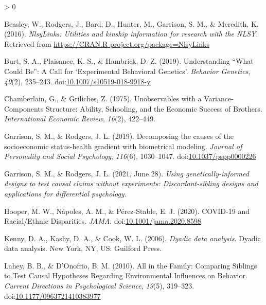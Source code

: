 \documentclass[10pt,a4paper,onecolumn]{article}
\newlength{\cslhangindent}
\newenvironment{CSLReferences}[2] %
 {%
  \setlength{\parindent}{0pt}
  \ifodd #1 \everypar{\setlength{\hangindent}{\cslhangindent}}\ignorespaces\fi
  \ifnum #2 > 0
  \setlength{\parskip}{#2\baselineskip}
  \fi
 }%
 {}
\begin{document}
\hypertarget{refs}{}
\begin{CSLReferences}{1}{0}
\leavevmode\hypertarget{ref-beasley2016}{}%
Beasley, W., Rodgers, J., Bard, D., Hunter, M., Garrison, S. M., \&
Meredith, K. (2016). \emph{NlsyLinks: Utilities and kinship information
for research with the NLSY}. Retrieved from
\url{https://CRAN.R-project.org/package=NlsyLinks}

\leavevmode\hypertarget{ref-burt2019}{}%
Burt, S. A., Plaisance, K. S., \& Hambrick, D. Z. (2019). Understanding
{``}What Could Be{''}: A Call for {`}Experimental Behavioral
Genetics{'}. \emph{Behavior Genetics}, \emph{49}(2), 235--243.
doi:\href{https://doi.org/10.1007/s10519-018-9918-y}{10.1007/s10519-018-9918-y}

\leavevmode\hypertarget{ref-chamberlain1975}{}%
Chamberlain, G., \& Griliches, Z. (1975). Unobservables with a
Variance-Components Structure: Ability, Schooling, and the Economic
Success of Brothers. \emph{International Economic Review}, \emph{16}(2),
422--449.

\leavevmode\hypertarget{ref-garrison2019}{}%
Garrison, S. M., \& Rodgers, J. L. (2019). Decomposing the causes of the
socioeconomic status-health gradient with biometrical modeling.
\emph{Journal of Personality and Social Psychology}, \emph{116}(6),
1030--1047.
doi:\href{https://doi.org/10.1037/pspp0000226}{10.1037/pspp0000226}

\leavevmode\hypertarget{ref-garrison2021}{}%
Garrison, S. M., \& Rodgers, J. L. (2021, June 28). \emph{Using
genetically-informed designs to test causal claims without experiments:
Discordant-sibling designs and applications for differential
psychology.}

\leavevmode\hypertarget{ref-hooper2020}{}%
Hooper, M. W., Nápoles, A. M., \& Pérez-Stable, E. J. (2020). COVID-19
and Racial/Ethnic Disparities. \emph{JAMA}.
doi:\href{https://doi.org/10.1001/jama.2020.8598}{10.1001/jama.2020.8598}

\leavevmode\hypertarget{ref-kenny2006}{}%
Kenny, D. A., Kashy, D. A., \& Cook, W. L. (2006). \emph{Dyadic data
analysis}. Dyadic data analysis. New York, NY, US: Guilford Press.

\leavevmode\hypertarget{ref-lahey2010}{}%
Lahey, B. B., \& D'Onofrio, B. M. (2010). All in the Family: Comparing
Siblings to Test Causal Hypotheses Regarding Environmental Influences on
Behavior. \emph{Current Directions in Psychological Science},
\emph{19}(5), 319--323.
doi:\href{https://doi.org/10.1177/0963721410383977}{10.1177/0963721410383977}


\end{CSLReferences}
\end{document}
